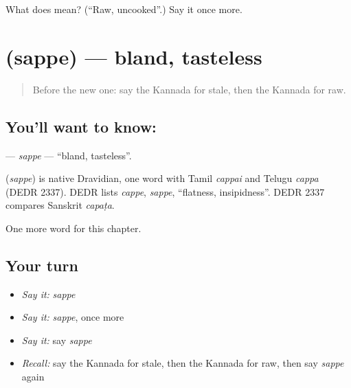 \begin{tcolorbox}[breakable,colback=teal!4,colframe=teal!35!black,title={Before you move on}]
What does  mean? (\textquotedblleft{}Raw, uncooked\textquotedblright{}.) Say it once more.
\end{tcolorbox}
\section[\texorpdfstring{\kn{ಸಪ್ಪೆ} (sappe)}{ಸಪ್ಪೆ (sappe)}]{ (sappe) — bland, tasteless}

\label{lesson:KA-C179-sappe}



\begin{quote}
Before the new one: say the Kannada for stale, then the Kannada for raw.
\end{quote}

\subsection*{You'll want to know: }
\textbf{} — \emph{sappe} — \textquotedblleft{}bland, tasteless\textquotedblright{}.

\begin{cousinweb}
\textbf{} (\emph{sappe}) is native Dravidian, one word with Tamil \emph{cappai} and Telugu \emph{cappa} (DEDR 2337). DEDR lists \emph{cappe}, \emph{sappe}, \textquotedblleft{}flatness, insipidness\textquotedblright{}. DEDR 2337 compares Sanskrit \emph{capaṭa}.
\end{cousinweb}

\begin{grammarlens}[title={What you've built}]
One more word for this chapter.
\end{grammarlens}

\subsection*{Your turn}
\begin{itemize}
\raggedright
  \item \emph{Say it:} \emph{sappe}
  \item \emph{Say it:} \emph{sappe}, once more
  \item \emph{Say it:} say \emph{sappe}
  \item \emph{Recall:} say the Kannada for stale, then the Kannada for raw, then say \emph{sappe} again
\end{itemize}

